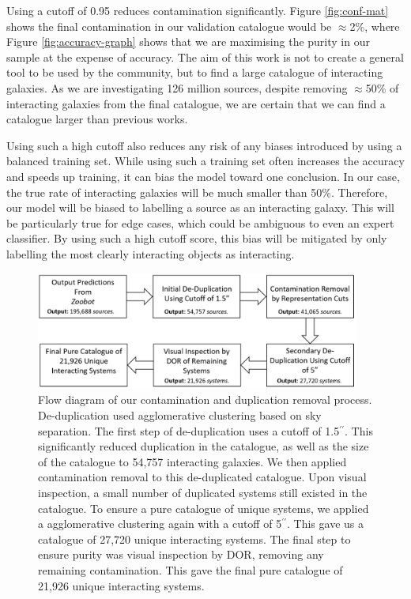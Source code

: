 Using a cutoff of 0.95 reduces contamination significantly. Figure \ref{fig:conf-mat} shows the final contamination in our validation catalogue would be $\approx$2\%, where Figure \ref{fig:accuracy-graph} shows that we are maximising the purity in our sample at the expense of accuracy. The aim of this work is not to create a general tool to be used by the community, but to find a large catalogue of interacting galaxies. As we are investigating 126 million sources, despite removing $\approx$50\% of interacting galaxies from the final catalogue, we are certain that we can find a catalogue larger than previous works.

Using such a high cutoff also reduces any risk of any biases introduced by using a balanced training set. While using such a training set often increases the accuracy and speeds up training, it can bias the model toward one conclusion. In our case, the true rate of interacting galaxies will be much smaller than 50\%. Therefore, our model will be biased to labelling a source as an interacting galaxy. This will be particularly true for edge cases, which could be ambiguous to even an expert classifier. By using such a high cutoff score, this bias will be mitigated by only labelling the most clearly interacting objects as interacting.

\begin{figure}
    \centering
    \includegraphics[width=0.95\textwidth]{Chapter2/figures/fig6.jpg}
    \caption[Flow diagram of our contamination and duplication removal process.]{Flow diagram of our contamination and duplication removal process. De-duplication used agglomerative clustering based on sky separation. The first step of de-duplication uses a cutoff of 1.5$^{\prime\prime}$. This significantly reduced duplication in the catalogue, as well as the size of the catalogue to 54,757 interacting galaxies. We then applied contamination removal to this de-duplicated catalogue. Upon visual inspection, a small number of duplicated systems still existed in the catalogue. To ensure a pure catalogue of unique systems, we applied a agglomerative clustering again with a cutoff of 5$^{\prime\prime}$. This gave us a catalogue of 27,720 unique interacting systems. The final step to ensure purity was visual inspection by DOR, removing any remaining contamination. This gave the final pure catalogue of 21,926 unique interacting systems.}
    \label{fig:flow-diagram}
\end{figure}

